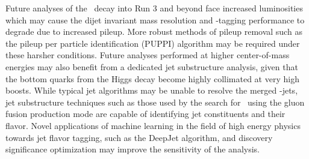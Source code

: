Future analyses of the \VHbb\ decay into Run 3 and beyond face increased luminosities which may cause the dijet invariant mass resolution and \qrkb-tagging performance to degrade due to increased pileup. More robust methods of pileup removal such as the pileup per particle identification (PUPPI)\cite{PUPPI} algorithm may be required under these harsher conditions. Future analyses performed at higher center-of-mass energies may also benefit from a dedicated jet substructure\cite{JETSUB} analysis, given that the bottom quarks from the Higgs decay become highly collimated at very high boosts. While typical jet algorithms may be unable to resolve the merged \qrkb-jets, jet substructure techniques such as those used by the search for \Htobb\ using the gluon fusion production mode\cite{ggHbb} are capable of identifying jet constituents and their flavor. Novel applications of machine learning in the field of high energy physics towards jet flavor tagging, such as the DeepJet\cite{DEEPJET} algorithm, and discovery significance optimization\cite{OPTSIG} may improve the sensitivity of the analysis.
